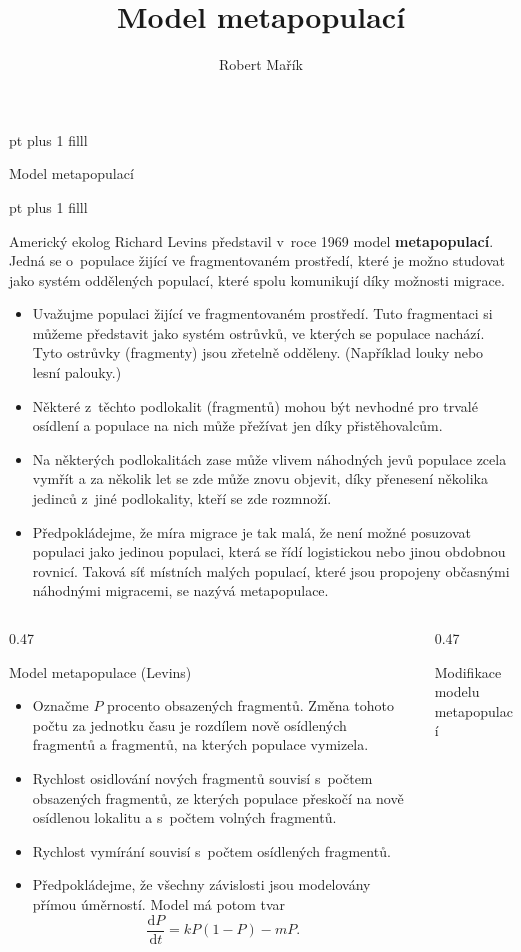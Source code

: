 \documentclass[handouts]{beamer}
\title{Model metapopulací}
\author{Robert Mařík}
\begin{document}
\begin{frame}

   pt plus 1 filll
  
  \begin{center}
    \large Model metapopulací
  \end{center}

   pt plus 1 filll

  Americký ekolog Richard Levins představil v roce 1969 model \textbf{metapopulací}. Jedná se o populace žijící ve fragmentovaném prostředí, které je možno studovat jako systém oddělených populací, které spolu komunikují díky možnosti migrace.

    \begin{itemize}
    \item Uvažujme populaci žijící ve fragmentovaném prostředí. Tuto
      fragmentaci si můžeme představit jako systém ostrůvků, ve
      kterých se populace nachází. Tyto ostrůvky (fragmenty) jsou
      zřetelně odděleny. (Například louky nebo lesní palouky.)
    \item 
Některé z těchto podlokalit (fragmentů) mohou být nevhodné pro trvalé osídlení a populace na nich může přežívat jen díky přistěhovalcům.
\item 
Na některých podlokalitách zase může vlivem náhodných jevů populace zcela vymřít a za několik let se zde může znovu objevit, díky přenesení několika jedinců z jiné podlokality, kteří se zde rozmnoží.
\item 
Předpokládejme, že míra migrace je tak malá, že není možné posuzovat populaci jako jedinou populaci, která se řídí logistickou nebo jinou obdobnou rovnicí. Taková síť místních malých populací, které jsou propojeny občasnými náhodnými migracemi, se nazývá metapopulace.
\end{itemize}

  
\begin{columns}
  \begin{column}{0.47\hsize}
\begin{block}{Model metapopulace (Levins)}
  \begin{itemize}
  \item Označme $P$ procento obsazených fragmentů. Změna tohoto počtu
    za jednotku času je rozdílem nově osídlených fragmentů a
    fragmentů, na kterých populace vymizela. 
  \item Rychlost osidlování
    nových fragmentů souvisí s počtem obsazených fragmentů, ze kterých
    populace přeskočí na nově osídlenou lokalitu a s počtem volných
    fragmentů.
  \item Rychlost vymírání souvisí s počtem osídlených fragmentů.
  \item Předpokládejme, že všechny závislosti jsou modelovány přímou úměrností. Model má potom tvar $$\frac{\mathrm dP}{\mathrm dt}=k P (1-P) - mP.$$
\end{itemize}
\end{block}
\end{column}
\begin{column}{0.47\hsize}
\begin{block}{Modifikace modelu metapopulací}


\end{block}
\end{column}
\end{columns}
\end{frame}
\end{document}
